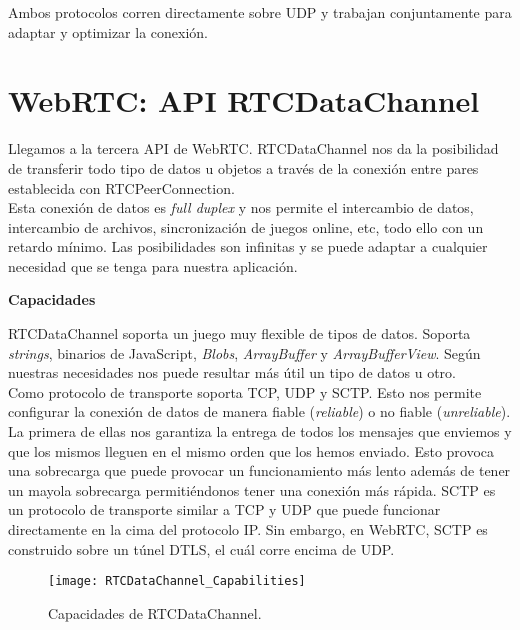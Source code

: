 Ambos protocolos corren directamente sobre UDP y trabajan conjuntamente para adaptar y optimizar la conexión.\\


\section{WebRTC: API RTCDataChannel}

Llegamos a la tercera API de WebRTC. RTCDataChannel nos da la posibilidad de transferir todo tipo de datos u objetos a través de la conexión entre pares establecida con RTCPeerConnection.\\

Esta conexión de datos es \textit{full duplex} y nos permite el intercambio de datos, intercambio de archivos, sincronización de juegos online, etc, todo ello con un retardo mínimo. Las posibilidades son infinitas y se puede adaptar a cualquier necesidad que se tenga para nuestra aplicación.\\

\begin{normalsize}
\noindent \textbf{Capacidades}\\
\end{normalsize}

RTCDataChannel soporta un juego muy flexible de tipos de datos. Soporta \textit{strings}, binarios de JavaScript, \textit{Blobs}, \textit{ArrayBuffer} y \textit{ArrayBufferView}. Según nuestras necesidades nos puede resultar más útil un tipo de datos u otro.\\

Como protocolo de transporte soporta TCP, UDP y SCTP. Esto nos permite configurar la conexión de datos de manera  fiable (\textit{reliable}) o no fiable (\textit{unreliable}). La primera de ellas nos garantiza la entrega de todos los mensajes que enviemos y que los mismos lleguen en el mismo orden que los hemos enviado. Esto provoca una sobrecarga que puede provocar un funcionamiento más lento además de tener un mayola sobrecarga permitiéndonos tener una conexión más rápida. SCTP es un protocolo de transporte similar a TCP y UDP que puede funcionar directamente en la cima del protocolo IP. Sin embargo, en WebRTC, SCTP es construido sobre un túnel DTLS, el cuál corre encima de UDP.

\begin{figure}[htb]
\centering
\texttt{[image: RTCDataChannel\_Capabilities]}
\caption{Capacidades de RTCDataChannel.}
\label{fig:datachannel_capabilities}
\end{figure}

